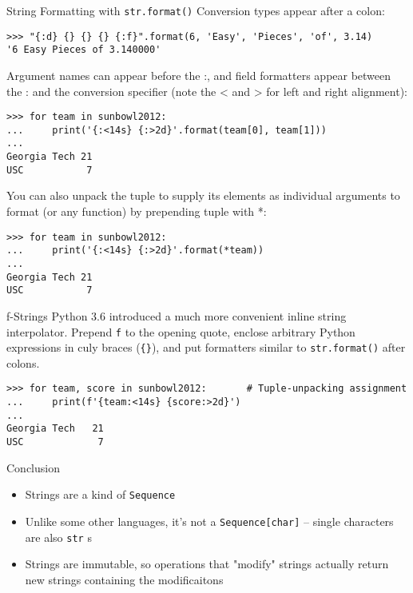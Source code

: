 \documentclass[smaller, aspectratio=1610]{beamer}
\begin{document}
\begin{frame}[label={sec:org852d406},fragile]{String Formatting with \texttt{str.format()}}
 Conversion types appear after a colon:

\lstset{language=Python,label= ,caption= ,captionpos=b,numbers=none}
\begin{lstlisting}
>>> "{:d} {} {} {} {:f}".format(6, 'Easy', 'Pieces', 'of', 3.14)
'6 Easy Pieces of 3.140000'
\end{lstlisting}

Argument names can appear before the :, and field formatters appear
between the : and the conversion specifier (note the < and > for left
and right alignment):

\lstset{language=Python,label= ,caption= ,captionpos=b,numbers=none}
\begin{lstlisting}
>>> for team in sunbowl2012:
...     print('{:<14s} {:>2d}'.format(team[0], team[1]))
...
Georgia Tech 21
USC           7
\end{lstlisting}

You can also unpack the tuple to supply its elements as individual
arguments to format (or any function) by prepending tuple with *:

\lstset{language=Python,label= ,caption= ,captionpos=b,numbers=none}
\begin{lstlisting}
>>> for team in sunbowl2012:
...     print('{:<14s} {:>2d}'.format(*team))
...
Georgia Tech 21
USC           7
\end{lstlisting}
\end{frame}

\begin{frame}[label={sec:org2eddfee},fragile]{f-Strings}
 Python 3.6 introduced a much more convenient inline string interpolator.  Prepend \texttt{f} to the opening quote, enclose arbitrary Python expressions in culy braces (\texttt{\{\}}), and put formatters similar to \texttt{str.format()} after colons.

\lstset{language=Python,label= ,caption= ,captionpos=b,numbers=none}
\begin{lstlisting}
>>> for team, score in sunbowl2012:       # Tuple-unpacking assignment
...     print(f'{team:<14s} {score:>2d}')
...
Georgia Tech   21
USC             7
\end{lstlisting}
\end{frame}

\begin{frame}[label={sec:orgafb4760},fragile]{Conclusion}
 \begin{itemize}
\item Strings are a kind of \texttt{Sequence}
\item Unlike some other languages, it's not a \texttt{Sequence[char]} -- single characters are also \texttt{str} s
\item Strings are immutable, so operations that "modify" strings actually return new strings containing the modificaitons
\end{itemize}
\end{frame}
\end{document}
